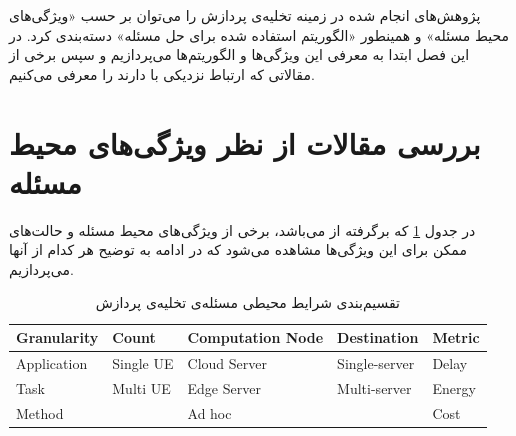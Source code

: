 پژوهش‌های انجام شده در زمینه تخلیه‌ی پردازش را می‌توان بر حسب «ویژگی‌های محیط مسئله» و همینطور «الگوریتم استفاده شده برای حل مسئله» دسته‌بندی کرد. در این فصل ابتدا به معرفی این ویژگی‌ها و الگوریتم‌ها می‌پردازیم و سپس برخی از مقالاتی که ارتباط نزدیکی با \CurrentProject دارند را معرفی می‌کنیم.

\section[ویژگی‌های محیط مسئله]{بررسی مقالات از نظر ویژگی‌های محیط مسئله} 
در جدول \ref{table:mohit} که برگرفته از \Cite{wang2019} می‌باشد، برخی از ویژگی‌های محیط مسئله و حالت‌های ممکن برای این ویژگی‌ها مشاهده می‌شود که در ادامه به توضیح هر کدام از آنها می‌پردازیم.
\begin{table}[H]
	\centering
	\begin{latin}

\begin{tabular}{@{}lllll@{}}
	\toprule
	\textbf{Granularity} & \textbf{Count} & \textbf{Computation Node} & \textbf{Destination} & \textbf{Metric} \\ \midrule
	Application          & Single UE             & Cloud Server      & Single-server        & Delay           \\
	Task                 & Multi UE   & Edge Server       & Multi-server         & Energy          \\
	Method               &             & Ad hoc            &                      & Cost            \\ \bottomrule
\end{tabular}
	\end{latin}
	\caption{تقسیم‌بندی شرایط محیطی مسئله‌ی تخلیه‌ی پردازش}
	\label{table:mohit}
\end{table}

